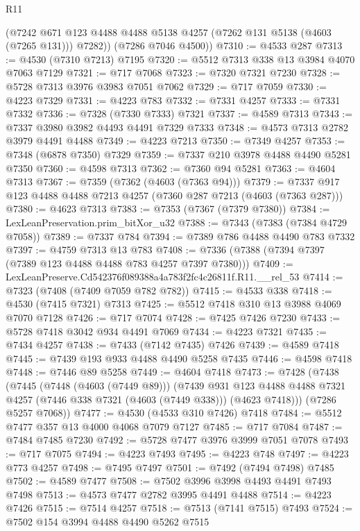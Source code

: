 \begin{lexlean}{R11}
\begin{coremodule}
        (@7242 @671 @123 @4488 @4488 @5138 @4257 (@7262 @131 @5138 (@4603 (@7265 @131))) @7282))
      (@7286 @7046 @4500))
@7310 := @4533 @287
@7313 := @4530 (@7310 @7213) @7195
@7320 := @5512 @7313 @338 @13 @3984 @4070 @7063 @7129
@7321 := @717 @7068
@7323 := @7320 @7321 @7230
@7328 := @5728 @7313 @3976 @3983 @7051 @7062
@7329 := @717 @7059
@7330 := @4223 @7329
@7331 := @4223 @783
@7332 := @7331 @4257
@7333 := @7331 @7332
@7336 := @7328 (@7330 @7333) @7321
@7337 := @4589 @7313
@7343 := @7337 @3980 @3982 @4493 @4491 @7329 @7333
@7348 := @4573 @7313 @2782 @3979 @4491 @4488
@7349 := @4223 @7213
@7350 := @7349 @4257
@7353 := @7348 (@6878 @7350) @7329
@7359 := @7337 @210 @3978 @4488 @4490 @5281 @7350
@7360 := @4598 @7313
@7362 := @7360 @94 @5281
@7363 := @4604 @7313
@7367 := @7359 (@7362 (@4603 (@7363 @94)))
@7379 := @7337 @917 @123 @4488 @4488 @7213 @4257 (@7360 @287 @7213 (@4603 (@7363 @287)))
@7380 := @4623 @7313
@7383 := @7353 (@7367 (@7379 @7380))
@7384 := LexLeanPreservation.prim_bitXor_u32
@7388 := @7343 (@7383 (@7384 @4729 @7058))
@7389 := @7337 @784
@7394 := @7389 @786 @4488 @4490 @783 @7332
@7397 := @4759 @7313 @13 @783
@7408 := @7336 (@7388 (@7394 @7397 (@7389 @123 @4488 @4488 @783 @4257 @7397 @7380)))
@7409 := LexLeanPreserve.Cd542376f089388a4a783f2fc4c26811f.R11.__rel_53
@7414 := @7323 (@7408 (@7409 @7059 @782 @782))
@7415 := @4533 @338
@7418 := @4530 (@7415 @7321) @7313
@7425 := @5512 @7418 @310 @13 @3988 @4069 @7070 @7128
@7426 := @717 @7074
@7428 := @7425 @7426 @7230
@7433 := @5728 @7418 @3042 @934 @4491 @7069
@7434 := @4223 @7321
@7435 := @7434 @4257
@7438 := @7433 (@7142 @7435) @7426
@7439 := @4589 @7418
@7445 := @7439 @193 @933 @4488 @4490 @5258 @7435
@7446 := @4598 @7418
@7448 := @7446 @89 @5258
@7449 := @4604 @7418
@7473 := @7428
    (@7438
      (@7445
        (@7448 (@4603 (@7449 @89)))
        (@7439
          @931
          @123
          @4488
          @4488
          @7321
          @4257
          (@7446 @338 @7321 (@4603 (@7449 @338)))
          (@4623 @7418)))
      (@7286 @5257 @7068))
@7477 := @4530 (@4533 @310 @7426) @7418
@7484 := @5512 @7477 @357 @13 @4000 @4068 @7079 @7127
@7485 := @717 @7084
@7487 := @7484 @7485 @7230
@7492 := @5728 @7477 @3976 @3999 @7051 @7078
@7493 := @717 @7075
@7494 := @4223 @7493
@7495 := @4223 @748
@7497 := @4223 @773 @4257
@7498 := @7495 @7497
@7501 := @7492 (@7494 @7498) @7485
@7502 := @4589 @7477
@7508 := @7502 @3996 @3998 @4493 @4491 @7493 @7498
@7513 := @4573 @7477 @2782 @3995 @4491 @4488
@7514 := @4223 @7426
@7515 := @7514 @4257
@7518 := @7513 (@7141 @7515) @7493
@7524 := @7502 @154 @3994 @4488 @4490 @5262 @7515

\end{coremodule}
\end{lexlean}
